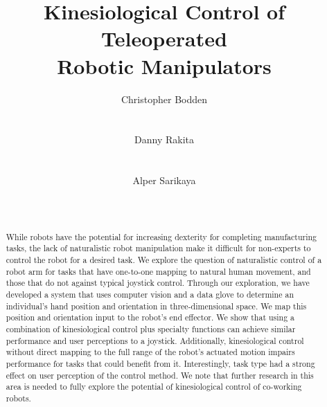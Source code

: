 \documentclass{sigchi}
\begin{document}
\title{Kinesiological Control of Teleoperated \\Robotic Manipulators}

\author{
  \alignauthor Christopher Bodden\\
    \\
    \\
  \alignauthor Danny Rakita\\
    \\
    \\
  \alignauthor Alper Sarikaya\\
    \\
    \\
}

\maketitle

\begin{abstract}
While robots have the potential for increasing dexterity for completing manufacturing tasks, the lack of naturalistic robot manipulation make it difficult for non-experts to control the robot for a desired task. We explore the question of naturalistic control of a robot arm for tasks that have one-to-one mapping to natural human movement, and those that do not against typical joystick control. Through our exploration, we have developed a system that uses computer vision and a data glove to determine an individual's hand position and orientation in three-dimensional space. We map this position and orientation input to the robot's end effector. We show that using a combination of kinesiological control plus specialty functions can achieve similar performance and user perceptions to a joystick. Additionally, kinesiological control without direct mapping to the full range of the robot's actuated motion impairs performance for tasks that could benefit from it. Interestingly, task type had a strong effect on user perception of the control method. We note that further research in this area is needed to fully explore the potential of kinesiological control of co-working robots.
\end{abstract}
\end{document}
